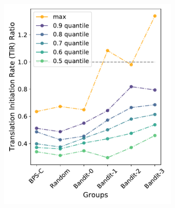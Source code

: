 \documentclass{article}
\begin{document}
\begin{figure}[!ht]
\begin{subfigure}[b]{0.25\textwidth}
        \includegraphics[scale=0.35]{plots/Main_Paper/quantplot.pdf}
    \end{subfigure}
    \begin{subfigure}[b]{0.25\textwidth}
        \centering
        \caption{}

\end{subfigure}
\end{figure}
\end{document}
